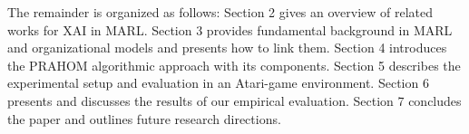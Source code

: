 \documentclass{ecai}
\newtheorem{theorem}{Theorem}
\newcounter{proof}
\renewcommand{\theproof}{\arabic{proof}}
\renewenvironment{proof}[1][]{
    \refstepcounter{proof}
    \noindent \raggedright \textit{\textbf{Proof. \theproof}}

    \setlength{\leftskip}{1em}

}
{

\
\setlength{\leftskip}{0pt}
}
\begin{document}

The remainder is organized as follows: Section 2 gives an overview of related works for XAI in MARL. Section 3 provides fundamental background in MARL and organizational models and presents how to link them. Section 4 introduces the PRAHOM algorithmic approach with its components. Section 5 describes the experimental setup and evaluation in an Atari-game environment. Section 6 presents and discusses the results of our empirical evaluation. Section 7 concludes the paper and outlines future research directions.





\end{document}
